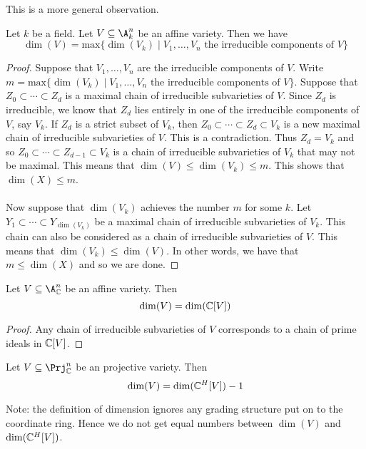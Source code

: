 \documentclass[a4paper]{article}
\begin{document}
This is a more general observation. 

\begin{lmm}{}{} Let $k$ be a field. Let $V\subseteq\A_k^n$ be an affine variety. Then we have $$\dim(V)=\text{max}\{\dim(V_k)\;|\;V_1,\dots,V_n\text{ the irreducible components of }V\}$$ 
\begin{proof}
Suppose that $V_1,\dots,V_n$ are the irreducible components of $V$. Write $m=\text{max}\{\dim(V_k)\;|\;V_1,\dots,V_n\text{ the irreducible components of }V\}$. Suppose that $Z_0\subset\cdots\subset Z_d$ is a maximal chain of irreducible subvarieties of $V$. Since $Z_d$ is irreducible, we know that $Z_d$ lies entirely in one of the irreducible components of $V$, say $V_k$. If $Z_d$ is a strict subset of $V_k$, then $Z_0\subset\cdots\subset Z_d\subset V_k$ is a new maximal chain of irreducible subvarieties of $V$. This is a contradiction. Thus $Z_d=V_k$ and so $Z_0\subset\cdots\subset Z_{d-1}\subset V_k$ is a chain of irreducible subvarieties of $V_k$ that may not be maximal. This means that $\dim(V)\leq\dim(V_k)\leq m$. This shows that $\dim(X)\leq m$. \\~\\

Now suppose that $\dim(V_k)$ achieves the number $m$ for some $k$. Let $Y_1\subset\cdots\subset Y_{\dim(V_k)}$ be a maximal chain of irreducible subvarieties of $V_k$. This chain can also be considered as a chain of irreducible subvarieties of $V$. This means that $\dim(V_k)\leq\dim(V)$. In other words, we have that $m\leq\dim(X)$ and so we are done. 
\end{proof}
\end{lmm}

\begin{prp}{}{} Let $V\subseteq\A_\C^n$ be an affine variety. Then $$\dim(V)=\dim(\mathbb{C}[V])$$ 
\begin{proof}
Any chain of irreducible subvarieties of $V$ corresponds to a chain of prime ideals in $\mathbb{C}[V]$. 
\end{proof}
\end{prp}

\begin{prp}{}{} Let $V\subseteq\Prj_\C^n$ be an projective variety. Then $$\dim(V)=\dim(\mathbb{C}^H[V])-1$$
\end{prp}

Note: the definition of dimension ignores any grading structure put on to the coordinate ring. Hence we do not get equal numbers between $\dim(V)$ and $\dim(\mathbb{C}^H[V])$. 
\end{document}
